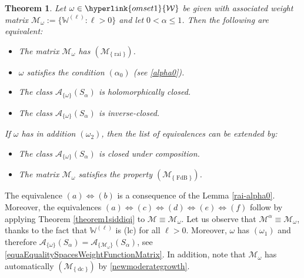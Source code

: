 \documentclass[11pt,a4paper]{article}
\makeatletter
\theoremstyle{plain}
\newtheorem{theorem}[proposition]{Theorem}
\theoremstyle{definition}
\DeclareRobustCommand\widecheck[1]{{\mathpalette\@widecheck{#1}}}
\def\@widecheck#1#2{%
	\setbox\z@\hbox{\m@th$#1#2$}%
	\setbox\tw@\hbox{\m@th$#1%
		\widehat{%
			\vrule\@width\z@\@height\ht\z@
			\vrule\@height\z@\@width\wd\z@}$}%
	\dp\tw@-\ht\z@
	\@tempdima\ht\z@ \advance\@tempdima2\ht\tw@ \divide\@tempdima\thr@@
	\setbox\tw@\hbox{%
		 \raise\@tempdima\hbox{\scalebox{1}[-1]{\lower\@tempdima\box
				\tw@}}}%
	{\ooalign{\box\tw@ \cr \box\z@}}}
\renewcommand{\check}[1]{\widecheck{#1}}
\newcommand{\W}{\mathbb{W}}
\let\on=\operatorname
\DeclareRobustCommand\widecheck[1]{{\mathpalette\@widecheck{#1}}}
\def\@widecheck#1#2{%
    \setbox\z@\hbox{\m@th$#1#2$}%
    \setbox\tw@\hbox{\m@th$#1%
       \widehat{%
          \vrule\@width\z@\@height\ht\z@
          \vrule\@height\z@\@width\wd\z@}$}%
    \dp\tw@-\ht\z@
    \@tempdima\ht\z@ \advance\@tempdima2\ht\tw@ \divide\@tempdima\thr@@
    \setbox\tw@\hbox{%
       \raise\@tempdima\hbox{\scalebox{1}[-1]{\lower\@tempdima\box
\tw@}}}%
    {\ooalign{\box\tw@ \cr \box\z@}}}
\makeatother
\begin{document}
\begin{theorem}\label{theorem1siddiqcase1}
Let $\omega\in\hyperlink{omset1}{\mathcal{W}}$ be given with associated weight matrix $\mathcal{M}_{\omega}:=\{\mathbb{W}^{(\ell)}: \ell>0\}$ and let $0<\alpha\le 1$. Then the following are equivalent:
	\begin{itemize}
		\item[$(a)$] The matrix $\mathcal{M}_{\omega}$ has \hyperlink{R-rai}{$(\mathcal{M}_{\{\on{rai}\}})$}.
		
		\item[$(b)$] $\omega$ satisfies the condition $(\alpha_0)$ (see \eqref{alpha0}).
		
		\item[$(c)$] The class $\mathcal{A}_{\{\omega\}}(S_{\alpha})$ is holomorphically closed.
		
		\item[$(d)$] The class $\mathcal{A}_{\{\omega\}}(S_{\alpha})$ is inverse-closed.
  \end{itemize}
	If $\omega$ has in addition $(\omega_2)$, then the list of equivalences can be extended by:

 \begin{itemize}
		\item[$(e)$] The class $\mathcal{A}_{\{\omega\}}(S_{\alpha})$ is closed under composition.
		
		\item[$(f)$] The matrix $\mathcal{M}_{\omega}$ satisfies the property \hyperlink{R-FdB}{$(\mathcal{M}_{\{\on{FdB}\}})$}.
\end{itemize}	
\end{theorem}
The equivalence $(a)\Leftrightarrow(b)$ is a consequence of the Lemma \ref{rai-alpha0}. Moreover, the equivalences $(a)\Leftrightarrow(c)\Leftrightarrow(d)\Leftrightarrow(e)\Leftrightarrow(f)$ follow by applying Theorem \ref{theorem1siddiqi} to $\mathcal{M}\equiv\mathcal{M}_{\omega}$. Let us observe that $\mathcal{M}^{\alpha}\equiv\mathcal{M}_{\omega}$, thanks to the fact that $\W^{(\ell)}$ is (lc) for all $\ell>0$. Moreover, $\omega$ has $(\omega_1)$ and therefore $\mathcal{A}_{\{\omega\}}(S_{\alpha})=\mathcal{A}_{\{\mathcal{M}_{\omega}\}}(S_{\alpha})$, see \eqref{equaEqualitySpacesWeightFunctionMatrix}. In addition, note that $\mathcal{M}_{\omega}$ has automatically \hyperlink{R-dc}{$(\mathcal{M}_{\{\on{dc}\}})$} by \eqref{newmoderategrowth}.
%
\end{document}
